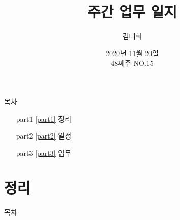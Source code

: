 \documentclass[aspectratio=1610,20pt,xcolor=pdftex,dvipsnames,table,handout]{beamer}
\begin{document}
	

			\title{ 주간 업무 일지 }
			\author{ 김대희 }
			\date{ 2020년 
						11월 
						20일\\ 
						48째주 
						NO.15  }


%
%
%


		\begin{frame}[plain]
		\titlepage
		\end{frame}


		\begin{frame} [plain]{목차}
		\tableofcontents%


			\setlength{\leftmargini}{ 2em}			
			\begin{itemize}

				\item [part1] \ref{part1}	정리
				\item [part2] \ref{part2}	일정
				\item [part3] \ref{part3}	업무

			\end{itemize}


		\end{frame}



		\part{정리 }
		\frame{\partpage}

\label{part1} 	%

		\begin{frame} [plain]{목차}
		\tableofcontents%
		\end{frame}
		

\end{document}
